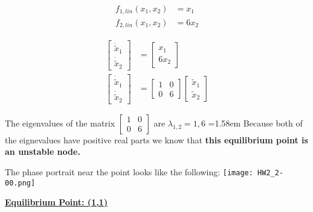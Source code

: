 \documentclass{article}
\begin{document}
  \begin{align*}
    f_{1, lin}(x_1,x_2) &= x_1 \\
    f_{2, lin}(x_1,x_2) &= 6x_2
  \end{align*}

  \begin{align*}
    \begin{bmatrix}
      \dot{\tilde{x}}_1 \\
      \dot{\tilde{x}}_2
    \end{bmatrix} &=
    \begin{bmatrix}
      x_1 \\
      6x_2
    \end{bmatrix} \\
    \begin{bmatrix}
      \dot{\tilde{x}}_1 \\
      \dot{\tilde{x}}_2
    \end{bmatrix} &=
    \begin{bmatrix}
      1 & 0 \\
      0 & 6
    \end{bmatrix} 
    \begin{bmatrix}
      \tilde{x}_1 \\
      \tilde{x}_2
    \end{bmatrix} 
  \end{align*}


  The eigenvalues of the matrix $\begin{bmatrix}
      1 & 0 \\
      0 & 6
  \end{bmatrix}$ are $\lambda_{1,2} = 1, 6$ \newline \newline
  \hangindent=1.58em
   Because both of the eignevalues have positive real parts  we know that \textbf{this
  equilibrium point is an unstable node.} \newline
  
  The phase portrait near the point looks like the following: \hspace{4mm}
  \texttt{[image: HW2\_2-00.png]} \newline \newline

 \textbf{\underline{Equilibrium Point: (1,\hspace{0.8mm}1)}}

\end{document}
